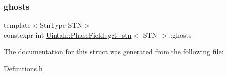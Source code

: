 \subsubsection{\texorpdfstring{ghosts}{ghosts}}
{\footnotesize\ttfamily template$<$Stn\+Type S\+TN$>$ \\
constexpr int \hyperlink{structUintah_1_1PhaseField_1_1get__stn}{Uintah\+::\+Phase\+Field\+::get\+\_\+stn}$<$ S\+TN $>$\+::ghosts\hspace{0.3cm}{\ttfamily [static]}}



The documentation for this struct was generated from the following file\+:\begin{DoxyCompactItemize}
\item 
\hyperlink{Definitions_8h}{Definitions.\+h}\end{DoxyCompactItemize}
